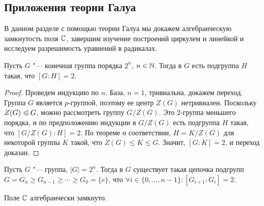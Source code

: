 \subsection{Приложения теории Галуа}

В данном разделе с помощью теории Галуа мы докажем алгебраическую замкнутость поля $\mathbb{C}$, завершим изучение построений циркулем и линейкой и исследуем разрешимость уравнений в радикалах.

\begin{proposition}
	Пусть $G$ "--- конечная группа порядка $2^n$, $n \in \mathbb{N}$. Тогда в $G$ есть подгруппа $H$ такая, что $[G : H] = 2$.
\end{proposition}

\begin{proof}
	Проведем индукцию по $n$. База, $n = 1$, тривиальна, докажем переход.
	Группа $G$ является $p$-группой, поэтому ее центр $Z(G)$ нетривиален. Поскольку $Z(G) \trianglelefteqslant G$, можно рассмотреть группу $G / Z(G)$. Это $2$-группа меньшего порядка, и по предположению индукции в $G / Z(G)$ есть подгруппа $H$ такая, что $[G / Z(G) : H] = 2$. По теореме о соответствии, $H = K / Z(G)$ для некоторой группы $K$ такой, что $Z(G) \le K \le G$. Значит, $[G : K] = 2$, и переход доказан.
\end{proof}

\begin{corollary}
	Пусть $G$ "--- группа, $|G| = 2^n$. Тогда в $G$ существует такая цепочка подгрупп $G = G_n \ge G_{n-1} \ge \dotsb \ge G_0 = \{e\}$, что $\forall i \in \{0, \dotsc, n-1\}: [G_{i + 1} : G_i] = 2$.
\end{corollary}

\begin{theorem}
	Поле $\mathbb{C}$ алгебраически замкнуто.
\end{theorem}

